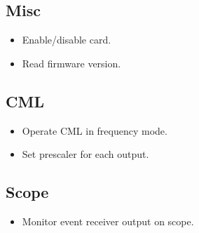 \documentclass[a4paper,10pt]{article}
\begin{document}
	\subsection{Misc}
	\begin{itemize}
		\item Enable/disable card.
		\item Read firmware version.
	\end{itemize}

	\subsection{CML}
	\begin{itemize}
		\item Operate CML in frequency mode.
		\item Set prescaler for each output.
	\end{itemize}

	\subsection{Scope}
	\begin{itemize}
		\item Monitor event receiver output on scope.
	\end{itemize}
\end{document}

